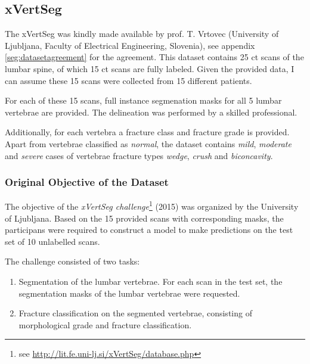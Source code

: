 \subsection{xVertSeg\label{sec:xVertSeg}}



The xVertSeg \cite{Ibragimov2012, xxx} was kindly made available by prof. T. Vrtovec (University of Ljubljana, Faculty of Electrical Engineering, Slovenia), see appendix \ref{seg:datasetagreement} for the agreement.
This dataset contains 25 \acrfull{ct} scans of the lumbar spine, of which 15 \acrshort{ct} scans are fully labeled.
Given the provided data, I can assume these 15 scans were collected from 15 different patients.

For each of these 15 scans, full instance segmenation masks for all 5 lumbar vertebrae are provided. The delineation was performed by a skilled professional.

Additionally, for each vertebra a fracture class and fracture grade is provided. 
Apart from vertebrae classified as \textit{normal}, the dataset contains \textit{mild}, \textit{moderate} and \textit{severe} cases of vertebrae fracture types \textit{wedge}, \textit{crush} and \textit{biconcavity}.

\subsubsection{Original Objective of the Dataset}

The objective of the \textit{xVertSeg challenge}\footnote{see \url{http://lit.fe.uni-lj.si/xVertSeg/database.php}} (2015) was organized by the University of Ljubljana.
Based on the 15 provided scans with corresponding masks, the participans were required to construct a model to make predictions on the test set of 10 unlabelled scans.

The challenge consisted of two tasks:
\begin{enumerate}
    \item Segmentation of the lumbar vertebrae. For each scan in the test set, the segmentation masks of the lumbar vertebrae were requested.
    \item Fracture classification on the segmented vertebrae, consisting of morphological grade and fracture classification.
\end{enumerate}

